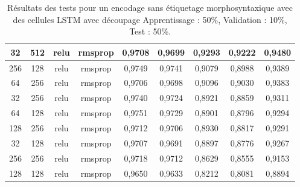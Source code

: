 \begin{table}[H]
{\begin{tabular}{|c|c|c|c|c|c|c|c|c|}
				32             & 512                     & relu                & rmsprop            & 0,9708                             & 0,9699                                & 0,9293                    & 0,9222                       & 0,9480                \\ \hline
				256            & 128                     & relu                & rmsprop            & 0,9749                             & 0,9741                                & 0,9079                    & 0,8988                       & 0,9389                \\ \hline
				64             & 256                     & relu                & rmsprop            & 0,9706                             & 0,9698                                & 0,9096                    & 0,9030                       & 0,9383                \\ \hline
				32             & 256                     & relu                & rmsprop            & 0,9740                             & 0,9724                                & 0,8921                    & 0,8859                       & 0,9311                \\ \hline
				64             & 128                     & relu                & rmsprop            & 0,9751                             & 0,9729                                & 0,8901                    & 0,8796                       & 0,9294                \\ \hline
				128            & 256                     & relu                & rmsprop            & 0,9712                             & 0,9706                                & 0,8930                    & 0,8817                       & 0,9291                \\ \hline
				32             & 128                     & relu                & rmsprop            & 0,9707                             & 0,9691                                & 0,8897                    & 0,8776                       & 0,9267                \\ \hline
				256            & 256                     & relu                & rmsprop            & 0,9718                             & 0,9712                                & 0,8629                    & 0,8555                       & 0,9153                \\ \hline
				128            & 128                     & relu                & rmsprop            & 0,9650                             & 0,9633                                & 0,8212                    & 0,8081                       & 0,8894                \\ \hline
			\end{tabular}%
		}
		\caption{Résultats des tests pour un encodage sans étiquetage morphosyntaxique avec des cellules LSTM avec découpage Apprentissage : 50\%, Validation : 10\%, Test : 50\%.}
		\label{tab:lstm_2}
	\end{table}
	
